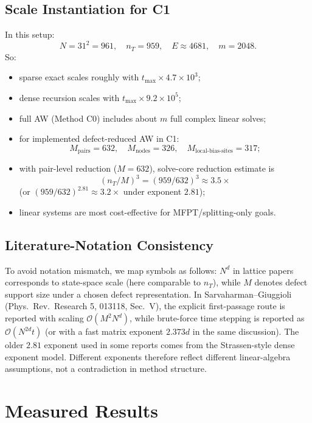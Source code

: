 \documentclass[11pt,a4paper]{article}
\begin{document}
\subsection{Scale Instantiation for C1}
In this setup:
\[
N=31^2=961,\quad n_T=959,\quad E\approx4681,\quad m=2048.
\]
So:
\begin{itemize}[leftmargin=2em]
  \item sparse exact scales roughly with $t_{\max}\times4.7\times10^3$;
  \item dense recursion scales with $t_{\max}\times9.2\times10^5$;
  \item full AW (Method C0) includes about $m$ full complex linear solves;
  \item for implemented defect-reduced AW in C1:
  \[
  M_{\text{pairs}}=632,\quad M_{\text{nodes}}=326,\quad M_{\text{local-bias-sites}}=317;
  \]
  \item with pair-level reduction ($M=632$), solve-core reduction estimate is
  \[
  (n_T/M)^3=(959/632)^3\approx3.5\times
  \]
  (or $(959/632)^{2.81}\approx3.2\times$ under exponent $2.81$);
  \item linear systems are most cost-effective for MFPT/splitting-only goals.
\end{itemize}

\subsection{Literature-Notation Consistency}
To avoid notation mismatch, we map symbols as follows:
$N^d$ in lattice papers corresponds to state-space scale (here comparable to $n_T$),
while $M$ denotes defect support size under a chosen defect representation.
In Sarvaharman--Giuggioli (Phys.\ Rev.\ Research 5, 013118, Sec.\ V), the explicit
first-passage route is reported with scaling $\mathcal O(M^2N^d)$, while brute-force
time stepping is reported as $\mathcal O(N^{2d}t)$ (or with a fast matrix exponent
$2.373d$ in the same discussion). The older $2.81$ exponent used in some reports
comes from the Strassen-style dense exponent model. Different exponents therefore
reflect different linear-algebra assumptions, not a contradiction in method structure.

\section{Measured Results}
\end{document}
